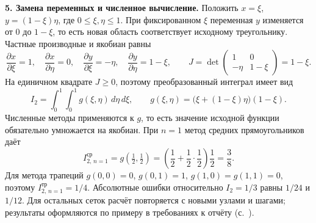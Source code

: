 \documentclass[12pt,a4paper]{article}
\begin{document}
\textbf{5. Замена переменных и численное вычисление.}
Положить $x=\xi$, $y=(1-\xi)\eta$, где $0\leq\xi,\eta\leq1$.
При фиксированном $\xi$ переменная $y$ изменяется от $0$ до $1-\xi$,
то есть новая область соответствует исходному треугольнику.
Частные производные и якобиан равны
\[
\frac{\partial x}{\partial\xi}=1,\quad
\frac{\partial x}{\partial\eta}=0,\quad
\frac{\partial y}{\partial\xi}=-\eta,\quad
\frac{\partial y}{\partial\eta}=1-\xi,\qquad
J=\det\begin{pmatrix}1&0\\-\eta&1-\xi\end{pmatrix}=1-\xi.
\]
На единичном квадрате $J\geq0$, поэтому преобразованный интеграл имеет вид
\[
I_2=\int_0^1\int_0^1g(\xi,\eta)\,d\eta\,d\xi,
\qquad g(\xi,\eta)=\bigl(\xi+(1-\xi)\eta\bigr)(1-\xi).
\]
Численные методы применяются к $g$, то есть значение исходной функции
обязательно умножается на якобиан. При $n=1$ метод средних прямоугольников даёт
\[
I_{2,\,n=1}^{\mathrm{ср}}=g(\tfrac12,\tfrac12)
=\left(\frac12+\frac12\cdot\frac12\right)\frac12=\frac38.
\]
Для метода трапеций $g(0,0)=0$, $g(0,1)=1$, $g(1,0)=g(1,1)=0$,
поэтому $I_{2,\,n=1}^{\mathrm{тр}}=1/4$.
Абсолютные ошибки относительно $I_2=1/3$ равны $1/24$ и $1/12$.
Для остальных сеток расчёт повторяется с новыми узлами и шагами;
результаты оформляются по примеру в требованиях к отчёту
(с.~\pageref{sec:error-example}).


\newpage
\end{document}
